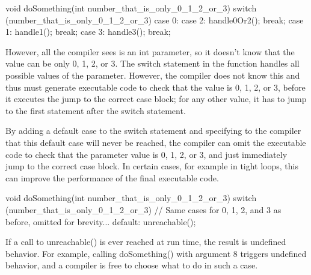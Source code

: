 \begin{cpp}
void doSomething(int number_that_is_only_0_1_2_or_3)
{
    switch (number_that_is_only_0_1_2_or_3) {
        case 0:
        case 2:
            handle0Or2(); break;
        case 1:
            handle1(); break;
        case 3:
            handle3(); break;
    }
}
\end{cpp}

However, all the compiler sees is an int parameter, so it doesn’t know that the value can be only 0, 1, 2, or 3. The switch statement in the function handles all possible values of the parameter. However, the compiler does not know this and thus must generate executable code to check that the value is 0, 1, 2, or 3, before it executes the jump to the correct case block; for any other value, it has to jump to the first statement after the switch statement.

By adding a default case to the switch statement and specifying to the compiler that this default case will never be reached, the compiler can omit the executable code to check that the parameter value is 0, 1, 2, or 3, and just immediately jump to the correct case block. In certain cases, for example in tight loops, this can improve the performance of the final executable code.

\begin{cpp}
void doSomething(int number_that_is_only_0_1_2_or_3)
{
    switch (number_that_is_only_0_1_2_or_3) {
        // Same cases for 0, 1, 2, and 3 as before, omitted for brevity...
        default:
            unreachable();
    }
}
\end{cpp}

If a call to unreachable() is ever reached at run time, the result is undefined behavior. For example, calling doSomething() with argument 8 triggers undefined behavior, and a compiler is free to choose what to do in such a case.











